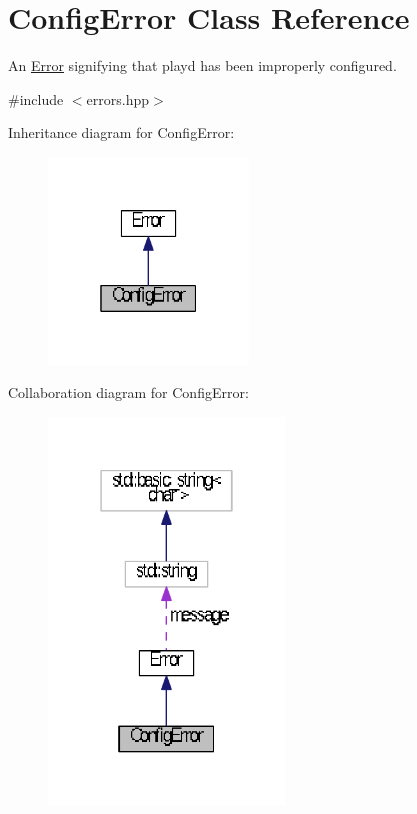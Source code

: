 \hypertarget{classConfigError}{\section{Config\+Error Class Reference}
\label{classConfigError}
}


An \hyperlink{classError}{Error} signifying that playd has been improperly configured.  




{\ttfamily \#include $<$errors.\+hpp$>$}



Inheritance diagram for Config\+Error\+:
\nopagebreak
\begin{figure}[H]
\begin{center}
\leavevmode
\includegraphics[width=151pt]{classConfigError__inherit__graph}
\end{center}
\end{figure}


Collaboration diagram for Config\+Error\+:
\nopagebreak
\begin{figure}[H]
\begin{center}
\leavevmode
\includegraphics[width=178pt]{classConfigError__coll__graph}
\end{center}
\end{figure}
